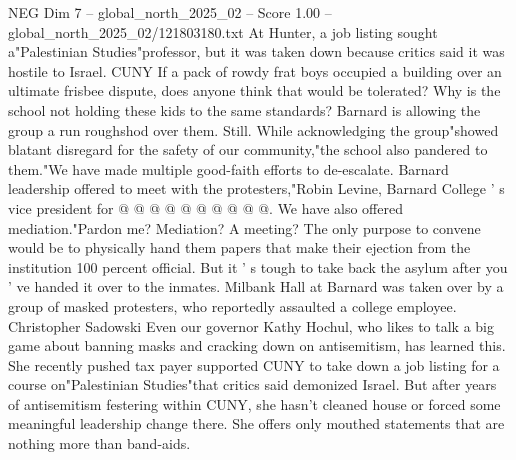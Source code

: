 \begin{textsample}{NEG Dim 7 – global\_north\_2025\_02 – Score 1.00 – global\_north\_2025\_02/121803180.txt}
At Hunter, a job listing sought a"Palestinian Studies"professor, but it was taken down because critics said it was hostile to Israel.
CUNY If a pack of rowdy frat boys occupied a building over an ultimate frisbee dispute, does anyone think that would be tolerated?
Why is the school not holding these kids to the same standards?
Barnard is allowing the group a run roughshod over them.
Still.
While acknowledging the group"showed blatant disregard for the safety of our community,"the school also pandered to them."We have made multiple good-faith efforts to de-escalate.
Barnard leadership offered to meet with the protesters,"Robin Levine, Barnard College ' s vice president for @ @ @ @ @ @ @ @ @ @.
We have also offered mediation."Pardon me?
Mediation?
A meeting?
The only purpose to convene would be to physically hand them papers that make their ejection from the institution 100 percent official.
But it ' s tough to take back the asylum after you ' ve handed it over to the inmates.
Milbank Hall at Barnard was taken over by a group of masked protesters, who reportedly assaulted a college employee.
Christopher Sadowski Even our governor Kathy Hochul, who likes to talk a big game about banning masks and cracking down on antisemitism, has learned this.
She recently pushed tax payer supported CUNY to take down a job listing for a course on"Palestinian Studies"that critics said demonized Israel.
But after years of antisemitism festering within CUNY, she hasn't cleaned house or forced some meaningful leadership change there.
She offers only mouthed statements that are nothing more than band-aids.

\end{textsample}
